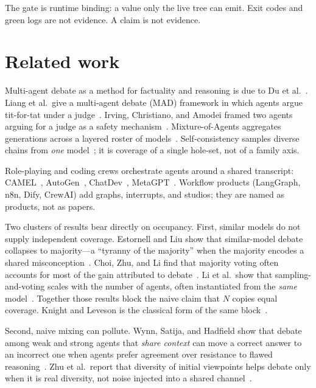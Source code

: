 \documentclass[11pt]{article}
\begin{document}
The gate is runtime binding: a value only the live tree can emit.
Exit codes and green logs are not evidence. A claim is not evidence.

\section{Related work}

Multi-agent debate as a method for factuality and reasoning is due to
Du et al.~\cite{debate}. Liang et al.\ give a multi-agent debate
(MAD) framework in which agents argue tit-for-tat under a
judge~\cite{mad}. Irving, Christiano, and Amodei framed two agents
arguing for a judge as a safety mechanism~\cite{irving}.
Mixture-of-Agents aggregates generations across a layered roster of
models~\cite{moa}. Self-consistency samples diverse chains from
\emph{one} model~\cite{selfcons}; it is coverage of a single hole-set,
not of a family axis.

Role-playing and coding crews orchestrate agents around a shared
transcript: CAMEL~\cite{camel}, AutoGen~\cite{autogen},
ChatDev~\cite{chatdev}, MetaGPT~\cite{metagpt}. Workflow products
(LangGraph, n8n, Dify, CrewAI) add graphs, interrupts, and studios;
they are named as products, not as papers.

Two clusters of results bear directly on occupancy. First, similar
models do not supply independent coverage. Estornell and Liu show that
similar-model debate collapses to majority---a ``tyranny of the
majority'' when the majority encodes a shared
misconception~\cite{estornell}. Choi, Zhu, and Li find that majority
voting often accounts for most of the gain attributed to
debate~\cite{debatevote}. Li et al.\ show that sampling-and-voting
scales with the number of agents, often instantiated from the
\emph{same} model~\cite{moreagents}. Together those results block the
naive claim that $N$ copies equal coverage. Knight and Leveson is the
classical form of the same block~\cite{knightleveson}.

Second, naive mixing can pollute. Wynn, Satija, and Hadfield show that
debate among weak and strong agents that \emph{share context} can move
a correct answer to an incorrect one when agents prefer agreement over
resistance to flawed reasoning~\cite{talkcheap}. Zhu et al.\ report
that diversity of initial viewpoints helps debate only when it is real
diversity, not noise injected into a shared channel~\cite{demystify}.
\end{document}
